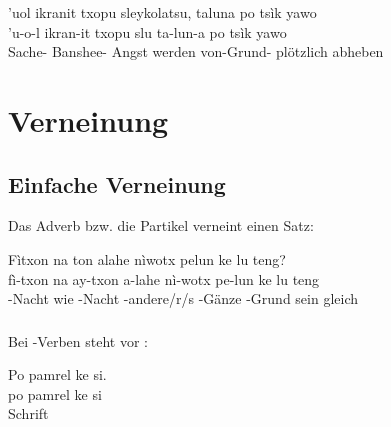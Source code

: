 \begin{interlin}
	\glll \Npawl{}'uol ikranit txopu sleykolatsu, taluna po tsìk yawo \\
	'u-o-l ikran-it txopu slu ta-lun-a po tsìk yawo \\
	Sache- Banshee- Angst werden von-Grund-  plötzlich abheben \\
\end{interlin}


\section{Verneinung}

\subsection{Einfache Verneinung} Das Adverb bzw. die Partikel  verneint einen Satz:

\begin{interlin}
	\glll \Npawl{}Fìtxon na ton alahe nìwotx pelun ke lu teng? \\
	fì-txon na ay-txon a-lahe nì-wotx pe-lun ke lu teng \\
	-Nacht wie -Nacht -andere/r/s -Gänze -Grund  sein gleich \\
\end{interlin}

\subsubsection{} Bei -Verben steht  vor :

\begin{interlin}
	\glll Po pamrel ke si. \\
	po pamrel ke si \\
	 Schrift   \\
\end{interlin}

